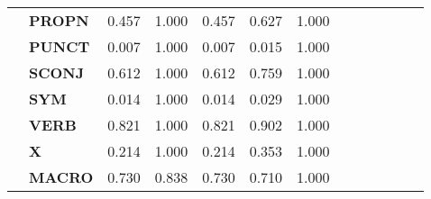 \begin{longtable}{|l||l||l||l||l||l||l||l||l||l||l||l||l|}
\textbf{} & \textbf{PROPN} & 0.457 & 1.000 & 0.457 & 0.627 & 1.000 \\
\textbf{} & \textbf{PUNCT} & 0.007 & 1.000 & 0.007 & 0.015 & 1.000 \\
\textbf{} & \textbf{SCONJ} & 0.612 & 1.000 & 0.612 & 0.759 & 1.000 \\
\textbf{} & \textbf{SYM} & 0.014 & 1.000 & 0.014 & 0.029 & 1.000 \\
\textbf{} & \textbf{VERB} & 0.821 & 1.000 & 0.821 & 0.902 & 1.000 \\
\textbf{} & \textbf{X} & 0.214 & 1.000 & 0.214 & 0.353 & 1.000 \\
\textbf{} & \textbf{MACRO} & 0.730 & 0.838 & 0.730 & 0.710 & 1.000 \\
\cline{1-7}
\end{longtable}
